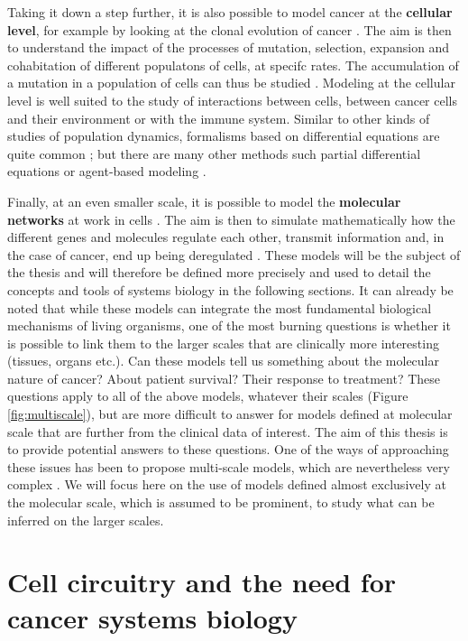 \documentclass[a4paper,12pt,twoside,onecolumn,openright,final,oldfontcommands]{memoir}
\begin{document}
Taking it down a step further, it is also possible to model cancer at
the \textbf{cellular level}, for example by looking at the clonal
evolution of cancer \citep{altrock2015mathematics}. The aim is then to
understand the impact of the processes of mutation, selection, expansion
and cohabitation of different populatons of cells, at specifc rates. The
accumulation of a mutation in a population of cells can thus be studied
\citep{bozic2010accumulation}. Modeling at the cellular level is well
suited to the study of interactions between cells, between cancer cells
and their environment or with the immune system. Similar to other kinds
of studies of population dynamics, formalisms based on differential
equations are quite common \citep{bellomo2008foundations}; but there are
many other methods such partial differential equations or agent-based
modeling \citep{letort2019physiboss}.

Finally, at an even smaller scale, it is possible to model the
\textbf{molecular networks} at work in cells \citep{le2015quantitative}.
The aim is then to simulate mathematically how the different genes and
molecules regulate each other, transmit information and, in the case of
cancer, end up being deregulated \citep{calzone2010mathematical}. These
models will be the subject of the thesis and will therefore be defined
more precisely and used to detail the concepts and tools of systems
biology in the following sections. It can already be noted that while
these models can integrate the most fundamental biological mechanisms of
living organisms, one of the most burning questions is whether it is
possible to link them to the larger scales that are clinically more
interesting (tissues, organs etc.). Can these models tell us something
about the molecular nature of cancer? About patient survival? Their
response to treatment? These questions apply to all of the above models,
whatever their scales (Figure \ref{fig:multiscale}), but are more
difficult to answer for models defined at molecular scale that are
further from the clinical data of interest. The aim of this thesis is to
provide potential answers to these questions. One of the ways of
approaching these issues has been to propose multi-scale models, which
are nevertheless very complex
\citep{anderson2008integrative, powathil2015systems}. We will focus here
on the use of models defined almost exclusively at the molecular scale,
which is assumed to be prominent, to study what can be inferred on the
larger scales.

\section{Cell circuitry and the need for cancer systems
biology}\label{cell-circuitry-and-the-need-for-cancer-systems-biology}
\end{document}

